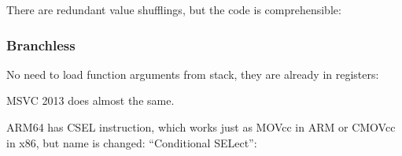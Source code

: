 

There are redundant value shufflings, but the code is comprehensible:



\subsubsection{Branchless}

No need to load function arguments from stack, they are already in registers:



MSVC 2013 does almost the same.

ARM64 has CSEL instruction, which works just as MOVcc in ARM or CMOVcc in x86, but name is changed:
``Conditional SELect'':



\fi
